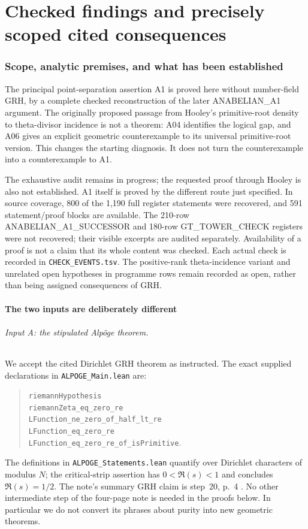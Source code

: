 \documentclass[11pt,a4paper]{article}
\begin{document}
\part{Checked findings and precisely scoped cited consequences}
\section{Scope, analytic premises, and what has been established}
\label{sec:premises}

The principal point-separation assertion A1 is proved here without
number-field GRH, by a complete checked reconstruction of the later
ANABELIAN\_A1 argument. The originally proposed passage from Hooley's
primitive-root density to theta-divisor incidence is not a theorem:
A04 identifies the logical gap, and A06 gives an explicit geometric
counterexample to its universal primitive-root version. This changes
the starting diagnosis. It does not turn the counterexample into a
counterexample to A1.

The exhaustive audit remains in progress; the
requested proof through Hooley is also not established. A1 itself
is proved by the different route just specified. In source coverage,
800 of the 1,190 full register statements were recovered, and 591
statement/proof blocks are available. The 210-row
ANABELIAN\_A1\_SUCCESSOR and 180-row GT\_TOWER\_CHECK registers were not
recovered; their visible excerpts are audited separately. Availability
of a proof is not a claim that its whole content was checked. Each
actual check is recorded in \texttt{CHECK\_EVENTS.tsv}. The positive-rank
theta-incidence variant and unrelated open hypotheses in programme
rows remain recorded as open, rather than being assigned consequences
of GRH.

\subsection{The two inputs are deliberately different}

\paragraph{Input A: the stipulated Alp\"oge theorem.}
We accept the cited Dirichlet GRH theorem as instructed. The exact
supplied declarations in \texttt{ALPOGE\_Main.lean} are:
\begin{quote}\small\raggedright
\texttt{riemannHypothesis}\\
\texttt{riemannZeta\_eq\_zero\_re}\\
\texttt{LFunction\_ne\_zero\_of\_half\_lt\_re}\\
\texttt{LFunction\_eq\_zero\_re}\\
\texttt{LFunction\_eq\_zero\_re\_of\_isPrimitive}.
\end{quote}
The definitions in \texttt{ALPOGE\_Statements.lean} quantify over
Dirichlet characters of modulus $N$; the critical-strip assertion
has $0<\Re(s)<1$ and concludes $\Re(s)=1/2$.
The note's summary GRH claim is step~20, p.~4 \cite{Alpoge}.
No other intermediate step of the four-page note is needed in the
proofs below. In particular we do not convert its phrases about
purity into new geometric theorems.
\end{document}
